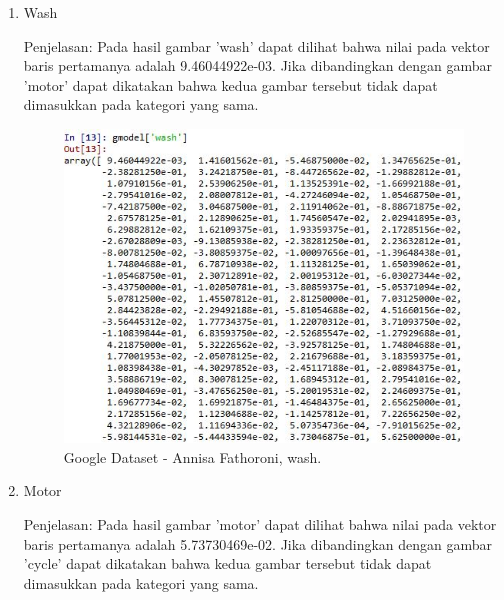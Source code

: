 \begin{enumerate}
\begin{enumerate}
\item Wash

Penjelasan: Pada hasil gambar 'wash' dapat dilihat bahwa nilai pada vektor baris pertamanya adalah 9.46044922e-03. Jika dibandingkan dengan gambar 'motor' dapat dikatakan bahwa kedua gambar tersebut tidak dapat dimasukkan pada kategori yang sama.

\begin{figure}[!hbtp]
\centering
\includegraphics[scale=0.7]{figures/Chapter5AnnisaFathoroni20wash.jpg}
\caption{Google Dataset - Annisa Fathoroni, wash.}
\label{Google Dataset - Annisa Fathoroni, wash.}
\end{figure}

\item Motor

Penjelasan: Pada hasil gambar 'motor' dapat dilihat bahwa nilai pada vektor baris pertamanya adalah 5.73730469e-02. Jika dibandingkan dengan gambar 'cycle' dapat dikatakan bahwa kedua gambar tersebut tidak dapat dimasukkan pada kategori yang sama.


\end{enumerate}
\end{enumerate}

